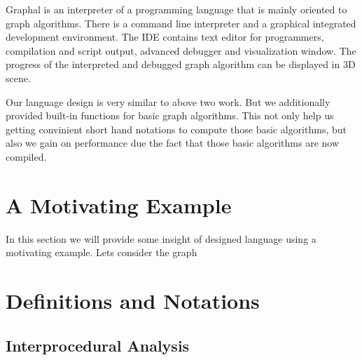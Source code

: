 \documentclass[letterpaper]{sig-alternate} \special{papersize=8.5in,11in}
\begin{document}
Graphal is an interpreter of a programming language that is mainly oriented to
graph algorithms. There is a command line interpreter and a graphical
integrated development environment. The IDE contains text editor for
programmers, compilation and script output, advanced debugger and visualization
window. The progress of the interpreted and debugged graph algorithm can be
displayed in 3D scene.

Our language design is very similar to above two work. But we additionally provided
built-in functions for basic graph algorithms. This not only help us getting
convinient short hand notations to compute those basic algorithms, but also we gain on 
performance due the fact that those basic algorithms are now compiled.



\section{A Motivating Example}\label{sec:motiv}
In this section we will provide some insight of designed language
using a motivating example.
Lets consider the graph 




\section{Definitions and Notations} \label{sec:Formal_Definitions}


\subsection{Interprocedural Analysis} \label{Interprocedural_Analysis}




%  
\end{document}
